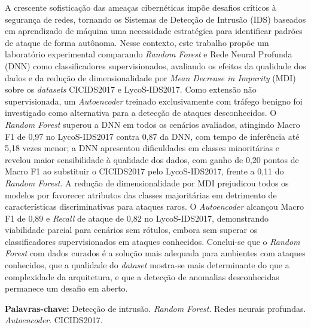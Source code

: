 A crescente sofisticação das ameaças cibernéticas impõe desafios críticos à segurança de redes, tornando os Sistemas de Detecção de Intrusão (IDS) baseados em aprendizado de máquina uma necessidade estratégica para identificar padrões de ataque de forma autônoma. Nesse contexto, este trabalho propõe um laboratório experimental comparando \textit{Random Forest} e Rede Neural Profunda (DNN) como classificadores supervisionados, avaliando os efeitos da qualidade dos dados e da redução de dimensionalidade por \textit{Mean Decrease in Impurity} (MDI) sobre os \textit{datasets} CICIDS2017 e LycoS-IDS2017. Como extensão não supervisionada, um \textit{Autoencoder} treinado exclusivamente com tráfego benigno foi investigado como alternativa para a detecção de ataques desconhecidos. O \textit{Random Forest} superou a DNN em todos os cenários avaliados, atingindo Macro F1 de 0,97 no LycoS-IDS2017 contra 0,87 da DNN, com tempo de inferência até 5,18 vezes menor; a DNN apresentou dificuldades em classes minoritárias e revelou maior sensibilidade à qualidade dos dados, com ganho de 0,20 pontos de Macro F1 ao substituir o CICIDS2017 pelo LycoS-IDS2017, frente a 0,11 do \textit{Random Forest}. A redução de dimensionalidade por MDI prejudicou todos os modelos por favorecer atributos das classes majoritárias em detrimento de características discriminativas para ataques raros. O \textit{Autoencoder} alcançou Macro F1 de 0,89 e \textit{Recall} de ataque de 0,82 no LycoS-IDS2017, demonstrando viabilidade parcial para cenários sem rótulos, embora sem superar os classificadores supervisionados em ataques conhecidos. Conclui-se que o \textit{Random Forest} com dados curados é a solução mais adequada para ambientes com ataques conhecidos, que a qualidade do \textit{dataset} mostra-se mais determinante do que a complexidade da arquitetura, e que a detecção de anomalias desconhecidas permanece um desafio em aberto.

\noindent\textbf{Palavras-chave:} Detecção de intrusão. \textit{Random Forest}. Redes neurais profundas. \textit{Autoencoder}. CICIDS2017.
